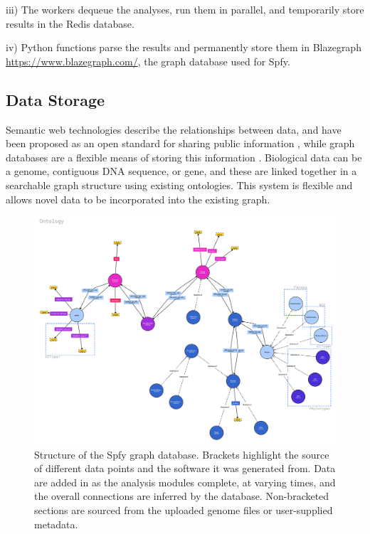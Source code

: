 \documentclass{article}
\begin{document}
iii) The workers dequeue the analyses, run them in parallel, and temporarily store results in the Redis database.

iv) Python functions parse the results and permanently store them in Blazegraph \url{https://www.blazegraph.com/}, the graph database used for Spfy.

\subsection{Data Storage}
Semantic web technologies describe the relationships between data, and have been proposed as an open standard for sharing public information \cite{berners2001semantic}, while graph databases are a flexible means of storing this information \cite{horrocks2005semantic}. Biological data can be a genome, contiguous DNA sequence, or gene, and these are linked together in a searchable graph structure using existing ontologies. This system is flexible and allows novel data to be incorporated into the existing graph.

\begin{figure}[!hb]
\begin{center}
\includegraphics[width=\textwidth]{images/ontology}
\end{center}
\caption{Structure of the Spfy graph database. Brackets highlight the source of different data points and the software it was generated from. Data are added in as the analysis modules complete, at varying times, and the overall connections are inferred by the database. Non-bracketed sections are sourced from the uploaded genome files or user-supplied metadata.}
\label{fig-ontology}
\end{figure}
\end{document}

